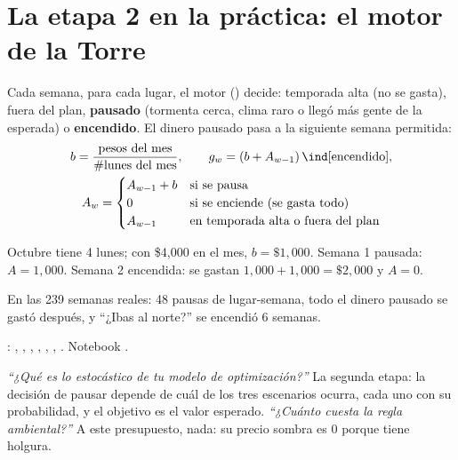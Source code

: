 \section{La etapa 2 en la práctica: el motor de la Torre}
Cada semana, para cada lugar, el motor () decide: temporada alta (no se gasta), fuera del plan,
\textbf{pausado} (tormenta cerca, clima raro o llegó más gente de la esperada) o \textbf{encendido}. El dinero pausado pasa
a la siguiente semana permitida:
\begin{gather*}
b=\frac{\text{pesos del mes}}{\#\text{lunes del mes}},\qquad g_w=(b+A_{w-1})\,\ind[\text{encendido}],\\
A_w=\begin{cases}A_{w-1}+b & \text{si se pausa}\\ 0 & \text{si se enciende (se gasta todo)}\\ A_{w-1} & \text{en temporada alta o fuera del plan}\end{cases}
\end{gather*}
\begin{amano}
Octubre tiene 4 lunes; con \$4,000 en el mes, $b=\$1{,}000$. Semana 1 pausada: $A=1{,}000$. Semana 2 encendida: se gastan
$1{,}000+1{,}000=\$2{,}000$ y $A=0$.
\end{amano}
En las 239 semanas reales: 48 pausas de lugar-semana, todo el dinero pausado se gastó después, y ``¿Ibas al norte?'' se
encendió 6 semanas.

\begin{codigoen}: , , ,
, , , . Notebook
.\end{codigoen}

\begin{teprofe}
\emph{``¿Qué es lo estocástico de tu modelo de optimización?''} La segunda etapa: la decisión de pausar depende de cuál de
los tres escenarios ocurra, cada uno con su probabilidad, y el objetivo es el valor esperado. \emph{``¿Cuánto cuesta la
regla ambiental?''} A este presupuesto, nada: su precio sombra es 0 porque tiene holgura.
\end{teprofe}
